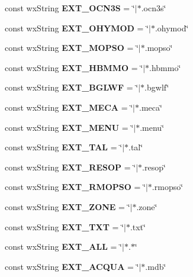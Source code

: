 \begin{DoxyCompactItemize}
\item 
const wx\+String {\bf E\+X\+T\+\_\+\+O\+C\+N3S} = \char`\"{}$\vert$$\ast$.ocn3s\char`\"{}
\item 
const wx\+String {\bf E\+X\+T\+\_\+\+O\+H\+Y\+M\+OD} = \char`\"{}$\vert$$\ast$.ohymod\char`\"{}
\item 
const wx\+String {\bf E\+X\+T\+\_\+\+M\+O\+P\+SO} = \char`\"{}$\vert$$\ast$.mopso\char`\"{}
\item 
const wx\+String {\bf E\+X\+T\+\_\+\+H\+B\+M\+MO} = \char`\"{}$\vert$$\ast$.hbmmo\char`\"{}
\item 
const wx\+String {\bf E\+X\+T\+\_\+\+B\+G\+L\+WF} = \char`\"{}$\vert$$\ast$.bgwlf\char`\"{}
\item 
const wx\+String {\bf E\+X\+T\+\_\+\+M\+E\+CA} = \char`\"{}$\vert$$\ast$.meca\char`\"{}
\item 
const wx\+String {\bf E\+X\+T\+\_\+\+M\+E\+NU} = \char`\"{}$\vert$$\ast$.menu\char`\"{}
\item 
const wx\+String {\bf E\+X\+T\+\_\+\+T\+AL} = \char`\"{}$\vert$$\ast$.tal\char`\"{}
\item 
const wx\+String {\bf E\+X\+T\+\_\+\+R\+E\+S\+OP} = \char`\"{}$\vert$$\ast$.resop\char`\"{}
\item 
const wx\+String {\bf E\+X\+T\+\_\+\+R\+M\+O\+P\+SO} = \char`\"{}$\vert$$\ast$.rmopso\char`\"{}
\item 
const wx\+String {\bf E\+X\+T\+\_\+\+Z\+O\+NE} = \char`\"{}$\vert$$\ast$.zone\char`\"{}
\item 
const wx\+String {\bf E\+X\+T\+\_\+\+T\+XT} = \char`\"{}$\vert$$\ast$.txt\char`\"{}
\item 
const wx\+String {\bf E\+X\+T\+\_\+\+A\+LL} = \char`\"{}$\vert$$\ast$.$\ast$\char`\"{}
\item 
const wx\+String {\bf E\+X\+T\+\_\+\+A\+C\+Q\+UA} = \char`\"{}$\vert$$\ast$.mdb\char`\"{}
\end{DoxyCompactItemize}
